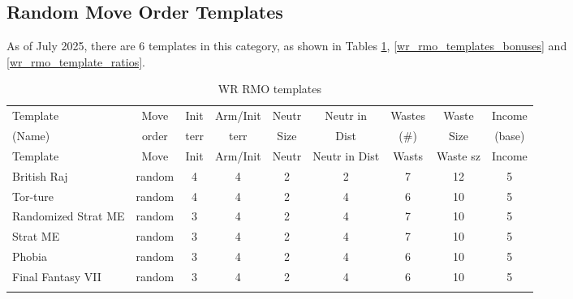 \subsection{Random Move Order Templates}

As of July 2025, there are 6 templates in this category, as shown in Tables \ref{wr_rmo_templates_basics}, \ref{wr_rmo_templates_bonuses} and \ref{wr_rmo_template_ratios}.


\scriptsize
\begin{longtable}{|l|c|c|c|c|c|c|c|c|}
\hline
\rowcolor{Baby_Blue}
Template & Move & Init & Arm/\newline Init & Neutr & Neutr in & Wastes & Waste & Income \\ 
\rowcolor{Baby_Blue}
(Name)   & order& terr & terr            & Size  & Dist      & (\#)   & Size  & (base) \\ \hline\hline
\endfirsthead
\hline
\rowcolor{Baby_Blue}
Template & Move & Init & Arm/\newline Init & Neutr & Neutr in Dist & Wasts & Waste sz & Income \\ \hline\hline
\endhead
British Raj             & random & 4 & 4 & 2 & 2 & 7  & 12 & 5 \\ 
Tor-ture                & random & 4 & 4 & 2 & 4 & 6  & 10 & 5 \\ \hline
Randomized Strat ME     & random & 3 & 4 & 2 & 4 & 7  & 10 & 5 \\ 
Strat ME                & random & 3 & 4 & 2 & 4 & 7  & 10 & 5 \\ 
Phobia                  & random & 3 & 4 & 2 & 4 & 6  & 10 & 5 \\ 
Final Fantasy VII       & random & 3 & 4 & 2 & 4 & 6  & 10 & 5 \\ \hline
\caption{WR RMO templates}
\label{wr_rmo_templates_basics}
\end{longtable}
\normalsize


